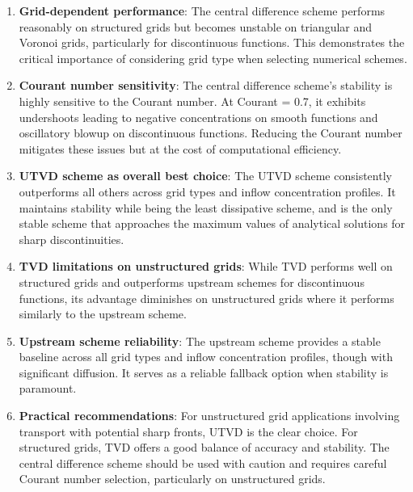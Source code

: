 \begin{enumerate}
\item \textbf{Grid-dependent performance}: The central difference scheme performs reasonably on structured grids but becomes unstable on triangular and Voronoi grids, particularly for discontinuous functions. This demonstrates the critical importance of considering grid type when selecting numerical schemes.

\item \textbf{Courant number sensitivity}: The central difference scheme's stability is highly sensitive to the Courant number. At Courant = 0.7, it exhibits undershoots leading to negative concentrations on smooth functions and oscillatory blowup on discontinuous functions. Reducing the Courant number mitigates these issues but at the cost of computational efficiency.

\item \textbf{UTVD scheme as overall best choice}: The UTVD scheme consistently outperforms all others across grid types and inflow concentration profiles. It maintains stability while being the least dissipative scheme, and is the only stable scheme that approaches the maximum values of analytical solutions for sharp discontinuities.

\item \textbf{TVD limitations on unstructured grids}: While TVD performs well on structured grids and outperforms upstream schemes for discontinuous functions, its advantage diminishes on unstructured grids where it performs similarly to the upstream scheme.

\item \textbf{Upstream scheme reliability}: The upstream scheme provides a stable baseline across all grid types and inflow concentration profiles, though with significant diffusion. It serves as a reliable fallback option when stability is paramount.

\item \textbf{Practical recommendations}: For unstructured grid applications involving transport with potential sharp fronts, UTVD is the clear choice. For structured grids, TVD offers a good balance of accuracy and stability. The central difference scheme should be used with caution and requires careful Courant number selection, particularly on unstructured grids.
\end{enumerate}                 
